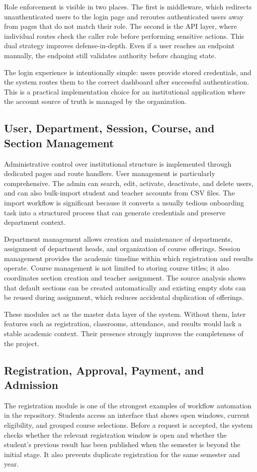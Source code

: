\documentclass[12pt,a4paper]{report}
\begin{document}
Role enforcement is visible in two places. The first is middleware, which redirects unauthenticated users to the login page and reroutes authenticated users away from pages that do not match their role. The second is the API layer, where individual routes check the caller role before performing sensitive actions. This dual strategy improves defense-in-depth. Even if a user reaches an endpoint manually, the endpoint still validates authority before changing state.

The login experience is intentionally simple: users provide stored credentials, and the system routes them to the correct dashboard after successful authentication. This is a practical implementation choice for an institutional application where the account source of truth is managed by the organization.

\subsection{User, Department, Session, Course, and Section Management}
Administrative control over institutional structure is implemented through dedicated pages and route handlers. User management is particularly comprehensive. The admin can search, edit, activate, deactivate, and delete users, and can also bulk-import student and teacher accounts from CSV files. The import workflow is significant because it converts a usually tedious onboarding task into a structured process that can generate credentials and preserve department context.

Department management allows creation and maintenance of departments, assignment of department heads, and organization of course offerings. Session management provides the academic timeline within which registration and results operate. Course management is not limited to storing course titles; it also coordinates section creation and teacher assignment. The source analysis shows that default sections can be created automatically and existing empty slots can be reused during assignment, which reduces accidental duplication of offerings.

These modules act as the master data layer of the system. Without them, later features such as registration, classrooms, attendance, and results would lack a stable academic context. Their presence strongly improves the completeness of the project.

\subsection{Registration, Approval, Payment, and Admission}
The registration module is one of the strongest examples of workflow automation in the repository. Students access an interface that shows open windows, current eligibility, and grouped course selections. Before a request is accepted, the system checks whether the relevant registration window is open and whether the student's previous result has been published when the semester is beyond the initial stage. It also prevents duplicate registration for the same semester and year.
\end{document}
